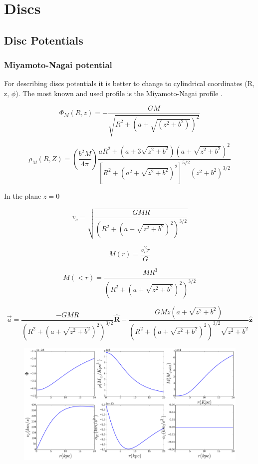 \chapter{Discs}\label{sec:Discs}
\section{Disc Potentials}

\subsection{Miyamoto-Nagai potential}

For describing discs potentials it is better to change to 
cylindrical coordinates (R, z, $\phi$). The most known and 
used profile is the Miyamoto-Nagai profile \citep{Miyamoto75}. 

\begin{equation}
\Phi_M (R, z) = - \dfrac{GM}{\sqrt{R^2 + (a + \sqrt{(z^2 + b^2)})^2}}
\end{equation}

\begin{equation}
\rho_M (R, Z) = \left( \dfrac{b^2 M}{4 \pi} \right) \dfrac{aR^2 + (a + 3\sqrt{z^2+b^2})(a + \sqrt{z^2+b^2})^2}{[R^2 + (a^2 + \sqrt{z^2+b^2})^2]^{5/2}(z^2+b^2)^{3/2} }
\end{equation}

In the plane $z=0$

\begin{equation}
v_c = \sqrt{\dfrac{GMR}{(R^2 + (a + \sqrt{z^2 + b^2})^2)^{3/2}}}
\end{equation}

\begin{equation}
M(r) = \dfrac{v_c^2 r}{G} 
\end{equation}

\begin{equation}
M(<r) = \dfrac{M R^3}{(R^2 + (a + \sqrt{z^2+b^2})^2)^{3/2}}
\end{equation}

\begin{equation}
\vec{a} = \dfrac{-GMR}{(R^2 + (a + \sqrt{z^2 + b^2})^2)^{3/2}} \mathbf{\hat{R}} - \dfrac{GMz (a + \sqrt{z^2+b^2})}{(R^2 + (a + \sqrt{z^2 + b^2})^2)^{3/2}\sqrt{z^2+b^2}} \mathbf{\hat{z}}
\end{equation}

\begin{figure}[H]\label{fig:MN}
\includegraphics[scale=0.35]{../figures/mn.png}
\end{figure}

